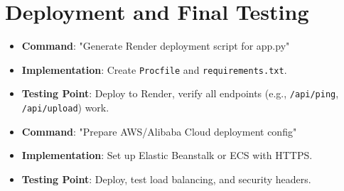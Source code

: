 \documentclass[a4paper,12pt]{article}
\begin{document}
\section{Deployment and Final Testing}
\begin{itemize}
    \item \textbf{Command}: "Generate Render deployment script for app.py"
    \item \textbf{Implementation}: Create \texttt{Procfile} and \texttt{requirements.txt}.
    \item \textbf{Testing Point}: Deploy to Render, verify all endpoints (e.g., \texttt{/api/ping}, \texttt{/api/upload}) work.
    \item \textbf{Command}: "Prepare AWS/Alibaba Cloud deployment config"
    \item \textbf{Implementation}: Set up Elastic Beanstalk or ECS with HTTPS.
    \item \textbf{Testing Point}: Deploy, test load balancing, and security headers.
\end{itemize}
\end{document}
